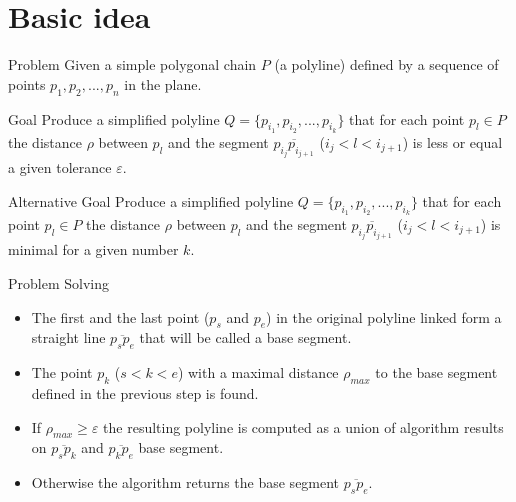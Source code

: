 \documentclass[10pt]{beamer}
\begin{document}
\section{Basic idea}

\begin{frame}{Problem}
Given a simple polygonal chain $P$  (a polyline) defined by a sequence of points $p_{1},p_{2},...,p_{n}$ in the plane. 

\begin{alertblock}{Goal}
Produce a simplified polyline  $Q=\{p_{i_{1}},p_{i_{2}},...,p_{i_{k}}\}$
that for each point $p_{l}\in P$ the distance $\rho$ between $p_{l}$
and the segment $\overline{p_{i_{j}}p_{i_{j+1}}}$ ($i_{j} < l < i_{j+1}$) 
is less or equal a given tolerance $\varepsilon$.
\end{alertblock}

\begin{alertblock}{Alternative Goal}
Produce a simplified polyline  $Q=\{p_{i_{1}},p_{i_{2}},...,p_{i_{k}}\}$
that for each point $p_{l}\in P$ the distance $\rho$ between $p_{l}$
and the segment $\overline{p_{i_{j}}p_{i_{j+1}}}$ ($i_{j} < l < i_{j+1}$)   
is  minimal for a given number $k$.
\end{alertblock}

\end{frame}

\begin{frame}{Problem Solving}
	\begin{itemize}
		\item %
			  The first and the last point ($p_{s}$ and $p_{e}$)  in the original polyline 
			  linked form a straight line $\overline{p_sp_e}$ that will be called a \alert{base segment}.		
		\item %
			  The point $p_k$ ($s <  k < e$) with a maximal distance $\rho_{max}$ 
			  to the base segment defined in the previous step is found. 
		\item %
		      If $\rho_{max} \geq \varepsilon$ the resulting polyline is computed 
		      as a union of algorithm results on $\overline{p_{s}p_k}$ 
		      and $\overline{p_kp_{e}}$   base segment.
		\item %
			  Otherwise the algorithm returns the base segment $\overline{p_sp_e}$.
	\end{itemize}
\end{frame}
\end{document}

